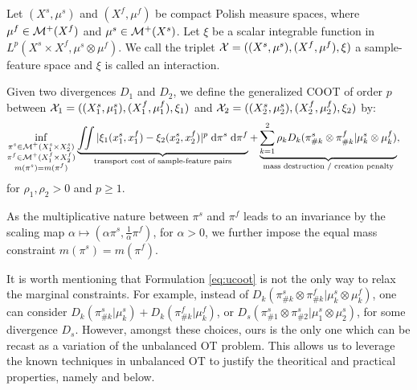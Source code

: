 \begin{definition}
Let $(X^s, \mu^s)$ and $(X^f, \mu^f)$ be compact Polish measure spaces, where $\mu^f \in \mathcal M^+(X^f)$
and $\mu^s \in \mathcal M^+(X^s)$. Let $\xi$ be a scalar integrable function in
$L^p(X^s \times X^f, \mu^s \otimes \mu^f)$. We call the triplet
$\mathcal X = ((X^s, \mu^s), (X^f, \mu^f), \xi)$ a sample-feature space and $\xi$ is called an interaction.
\end{definition}
%
\begin{definition}
\label{def:ucoot}
Given two divergences $D_1$ and $D_2$, we define the generalized COOT of order $p$
between $\mathcal X_1 = ((X_1^s, \mu_1^s), (X_1^f, \mu_1^f), \xi_1)$ and
$\mathcal X_2 = ((X_2^s, \mu_2^s), (X_2^f, \mu_2^f), \xi_2)$ by:
\begin{equation}
\label{eq:ucoot}
  \begin{split}
  \inf_{\substack{\pi^s \in \mathcal M^+(X_1^s \times X_2^s) \\
  \pi^f \in \mathcal M^+(X_1^f \times X_2^f) \\ m(\pi^s) = m(\pi^f)}}
  &\underbrace{\iint |\xi_1(x_1^s, x_1^f) - \xi_2(x_2^s, x_2^f)|^p
  \; \mathrm d\pi^s \; \mathrm d \pi^f}_{\text{transport cost of sample-feature pairs}}
  + \underbrace{\sum_{k=1}^2\rho_k D_k(\pi^s_{\#k} \otimes \pi^f_{\#k} |
  \mu^s_k \otimes \mu^f_k)}_{\text{mass destruction / creation penalty}},
  \end{split}
\end{equation}
for $\rho_1, \rho_2 >0$ and $p \geq 1$.
\end{definition}
As the multiplicative nature between $\pi^s$ and $\pi^f$ leads to an invariance by the scaling map
$\alpha \mapsto (\alpha \pi^s, \frac{1}{\alpha} \pi^f)$, for $\alpha > 0$,
we further impose the equal mass constraint $m(\pi^s) = m(\pi^f)$.

It is worth mentioning that Formulation \eqref{eq:ucoot} is not the only way to
relax the marginal constraints. For example, instead of
$D_k(\pi^s_{\#k} \otimes \pi^f_{\#k} | \mu^s_k \otimes \mu^f_k)$,
one can consider $D_k(\pi^s_{\#k} | \mu^s_k) + D_k( \pi^f_{\#k} | \mu^f_k)$,
or $D_s(\pi^s_{\#1} \otimes \pi^s_{\#2} | \mu^s_1 \otimes \mu^s_2)$,
for some divergence $D_s$. However, amongst these choices,
ours is the only one which can be recast as a variation of the unbalanced OT problem.
This allows us to leverage the known techniques in unbalanced OT to justify
the theoritical and practical properties, namely 
and  below.

